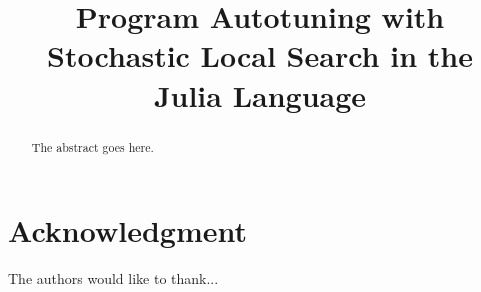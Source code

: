 \documentclass[conference,a4paper]{IEEEtran}
\begin{document}
\title{Program Autotuning with Stochastic Local Search in the Julia Language}

\author{
}

\maketitle

\begin{abstract}
The abstract goes here.
\end{abstract}

\IEEEpeerreviewmaketitle








\section*{Acknowledgment}

The authors would like to thank...




\end{document}
